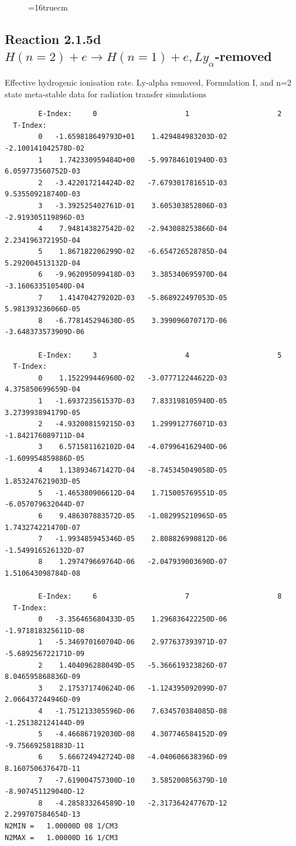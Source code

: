 \documentclass[12pt,dvipdfmx]{article}
\begin{document}
\begin{figure} \label{2.1.5c}
\epsfxsize=16truecm
\end{figure}
\newpage
\subsection{
Reaction 2.1.5d  $H(n=2) + e \rightarrow H(n=1) + e, Ly_\alpha$-removed}


   Effective hydrogenic ionisation rate.
   Ly-alpha removed, Formulation I, and n=2 state meta-stable
   data for radiation transfer simulations

\begin{small}\begin{verbatim}
        E-Index:     0                     1                     2
  T-Index:
        0   -1.659818649793D+01    1.429484983203D-02   -2.100141042578D-02
        1    1.742330959484D+00   -5.997846101940D-03    6.059773560752D-03
        2   -3.422017214424D-02   -7.679301781651D-03    9.535509218740D-03
        3   -3.392525402761D-01    3.605303852806D-03   -2.919305119896D-03
        4    7.948143827542D-02   -2.943088253866D-04    2.234196372195D-04
        5    1.867182206299D-02   -6.654726528785D-04    5.292004513132D-04
        6   -9.962095099418D-03    3.385340695970D-04   -3.160633510540D-04
        7    1.414704279202D-03   -5.868922497053D-05    5.981393236066D-05
        8   -6.778145294630D-05    3.399096070717D-06   -3.648373573909D-06

        E-Index:     3                     4                     5
  T-Index:
        0    1.152299446960D-02   -3.077712244622D-03    4.375850699659D-04
        1   -1.693723561537D-03    7.833198105940D-05    3.273993894179D-05
        2   -4.932008159215D-03    1.299912776071D-03   -1.842176089711D-04
        3    6.571581162102D-04   -4.079964162940D-06   -1.609954859886D-05
        4    1.138934671427D-04   -8.745345049058D-05    1.853247621903D-05
        5   -1.465380906612D-04    1.715005769551D-05   -6.057079632044D-07
        6    9.486307883572D-05   -1.082995210965D-05    1.743274221470D-07
        7   -1.993485945346D-05    2.808826990812D-06   -1.549916526132D-07
        8    1.297479669764D-06   -2.047939003690D-07    1.510643098784D-08

        E-Index:     6                     7                     8
  T-Index:
        0   -3.356465680433D-05    1.296836422250D-06   -1.971818325611D-08
        1   -5.346970160704D-06    2.977637393971D-07   -5.689256722171D-09
        2    1.404096288049D-05   -5.366619323826D-07    8.046595868836D-09
        3    2.175371740624D-06   -1.124395092099D-07    2.066437244946D-09
        4   -1.751213305596D-06    7.634570384085D-08   -1.251382124144D-09
        5   -4.466867192030D-08    4.307746584152D-09   -9.756692581883D-11
        6    5.666724942724D-08   -4.040606638396D-09    8.160750637647D-11
        7   -7.619004757300D-10    3.585200856379D-10   -8.907451129040D-12
        8   -4.285833264589D-10   -2.317364247767D-12    2.299707584654D-13
N2MIN =   1.00000D 08 1/CM3
N2MAX =   1.00000D 16 1/CM3


\end{verbatim}
\end{small}
\end{document}
